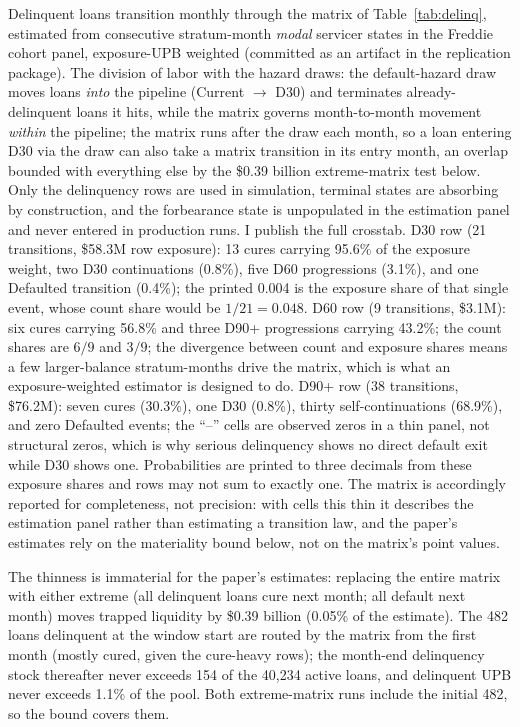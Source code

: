 \documentclass[12pt]{article}
\begin{document}
Delinquent loans transition monthly through the matrix of Table~\ref{tab:delinq}, estimated from consecutive stratum-month \emph{modal} servicer states in the Freddie cohort panel, exposure-UPB weighted (committed as an artifact in the replication package). The division of labor with the hazard draws: the default-hazard draw moves loans \emph{into} the pipeline (Current $\to$ D30) and terminates already-delinquent loans it hits, while the matrix governs month-to-month movement \emph{within} the pipeline; the matrix runs after the draw each month, so a loan entering D30 via the draw can also take a matrix transition in its entry month, an overlap bounded with everything else by the \$0.39 billion extreme-matrix test below. Only the delinquency rows are used in simulation, terminal states are absorbing by construction, and the forbearance state is unpopulated in the estimation panel and never entered in production runs.
I publish the full crosstab. D30 row (21 transitions, \$58.3M row exposure): 13 cures carrying 95.6\% of the exposure weight, two D30 continuations (0.8\%), five D60 progressions (3.1\%), and one Defaulted transition (0.4\%); the printed 0.004 is the exposure share of that single event, whose count share would be $1/21 = 0.048$. D60 row (9 transitions, \$3.1M): six cures carrying 56.8\% and three D90+ progressions carrying 43.2\%; the count shares are $6/9$ and $3/9$; the divergence between count and exposure shares means a few larger-balance stratum-months drive the matrix, which is what an exposure-weighted estimator is designed to do. D90+ row (38 transitions, \$76.2M): seven cures (30.3\%), one D30 (0.8\%), thirty self-continuations (68.9\%), and zero Defaulted events; the ``--'' cells are observed zeros in a thin panel, not structural zeros, which is why serious delinquency shows no direct default exit while D30 shows one. Probabilities are printed to three decimals from these exposure shares and rows may not sum to exactly one. The matrix is accordingly reported for completeness, not precision: with cells this thin it describes the estimation panel rather than estimating a transition law, and the paper's estimates rely on the materiality bound below, not on the matrix's point values.

The thinness is immaterial for the paper's estimates: replacing the entire matrix with either extreme (all delinquent loans cure next month; all default next month) moves trapped liquidity by \$0.39 billion (0.05\% of the estimate). The 482 loans delinquent at the window start are routed by the matrix from the first month (mostly cured, given the cure-heavy rows); the month-end delinquency stock thereafter never exceeds 154 of the 40,234 active loans, and delinquent UPB never exceeds 1.1\% of the pool. Both extreme-matrix runs include the initial 482, so the bound covers them.
\end{document}
